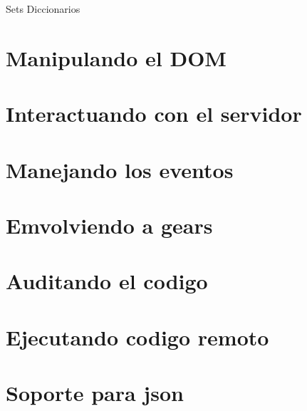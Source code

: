 Sets
Diccionarios

\section{Manipulando el DOM}

\section{Interactuando con el servidor}

\section{Manejando los eventos}

\section{Emvolviendo a gears}

\section{Auditando el codigo}

\section{Ejecutando codigo remoto}

\section{Soporte para json}